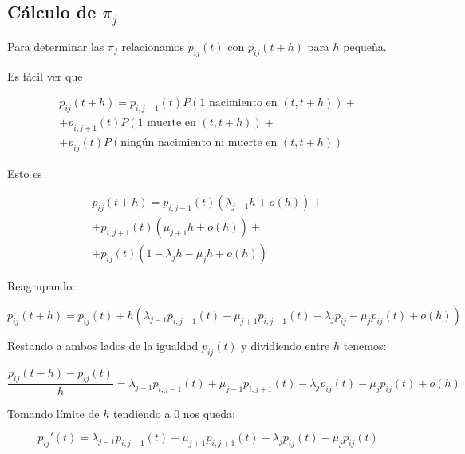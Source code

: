 \subsection{Cálculo de $\pi_j$}

Para determinar las $\pi_j$ relacionamos $p_{ij}(t)$ con $p_{ij}(t+h)$ para $h$ pequeña. 

Es fácil ver que

\begin{equation*}
\begin{split}
p_{ij}(t+h)= p_{i,j-1}(t)P(\textrm{1 nacimiento en } (t,t+h))+\\
+ p_{i,j+1}(t)P(\textrm{1 muerte en }(t,t+h))+\\
+ p_{ij}(t)P(\textrm{ningún nacimiento ni muerte en }(t,t+h))
\end{split}
\end{equation*}

Esto es


\begin{equation}
\begin{split}
p_{ij}(t+h)= p_{i,j-1}(t)(\lambda_{j-1}h + o(h))+\\
+ p_{i,j+1}(t)(\mu_{j+1}h + o(h))+\\
+ p_{ij}(t)(1-\lambda_{j}h - \mu_{j}h + o(h) )
\end{split}
\end{equation}



Reagrupando:

\begin{equation*}
p_{ij}(t+h) = p_{ij}(t) + h(\lambda_{j-1} p_{i,j-1}(t) + \mu_{j+1}  p_{i,j+1}(t) - \lambda_j  p_{ij} - \mu_{j} p_{ij}(t) + o(h))
\end{equation*}



Restando a ambos lados de la igualdad $p_{ij}(t)$ y dividiendo entre $h$ tenemos:


\begin{equation*}
\frac{p_{ij}(t+h)-p_{ij}(t)}{h}=\lambda_{j-1} p_{i,j-1}(t) + \mu_{j+1}  p_{i,j+1}(t) - \lambda_j  p_{ij}(t) - \mu_{j} p_{ij}(t) + o(h)
\end{equation*}

Tomando límite de $h$ tendiendo a 0 nos queda:


\begin{equation*}
p_{ij}'(t)= \lambda_{j-1} p_{i,j-1}(t) + \mu_{j+1}  p_{i,j+1}(t) - \lambda_j  p_{ij}(t) - \mu_{j} p_{ij}(t)
\end{equation*}

